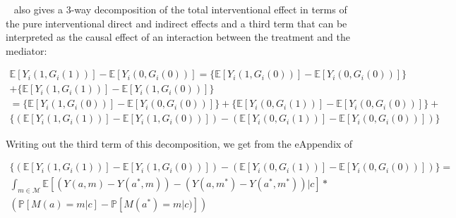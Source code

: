 ~\cite{vanderweele2014} also gives a 3-way decomposition of the total interventional effect in terms of the 
pure interventional direct and indirect effects and a third term that can be interpreted as the causal effect
of an interaction between the treatment and the mediator:

\begin{equation}
\begin{aligned}
	\mathbb{E}[Y_{i}(1,G_{i}(1))] - \mathbb{E}[Y_{i}(0,G_{i}(0))] = 
	\{\mathbb{E}[Y_{i}(1,G_{i}(0))] - \mathbb{E}[Y_{i}(0,G_{i}(0))]\}\\ 
	+ \{\mathbb{E}[Y_{i}(1,G_{i}(1))] - \mathbb{E}[Y_{i}(1,G_{i}(0))]\}\\
	= \{\mathbb{E}[Y_{i}(1,G_{i}(0))] - \mathbb{E}[Y_{i}(0,G_{i}(0))]\}
	+ \{\mathbb{E}[Y_{i}(0,G_{i}(1))] - \mathbb{E}[Y_{i}(0,G_{i}(0))]\} + \\
	\{(\mathbb{E}[Y_{i}(1,G_{i}(1))] - \mathbb{E}[Y_{i}(1,G_{i}(0))]) - 
	(\mathbb{E}[Y_{i}(0,G_{i}(1))] - \mathbb{E}[Y_{i}(0,G_{i}(0))])\}
\end{aligned}
\end{equation}

Writing out the third term of this decomposition, we get from the eAppendix of~\cite{vanderweele2014} 

\begin{equation}
\begin{aligned}
	\{(\mathbb{E}[Y_{i}(1,G_{i}(1))] - \mathbb{E}[Y_{i}(1,G_{i}(0))]) - 
	(\mathbb{E}[Y_{i}(0,G_{i}(1))] - \mathbb{E}[Y_{i}(0,G_{i}(0))])\} =\\
	\int_{m \in \mathcal{M}} \mathbb{E}[(Y(a,m) - Y(a^{*},m)) - (Y(a,m^{*}) - Y(a^{*},m^{*}))|c]*\\
	(\mathbb{P}[M(a) = m | c] - \mathbb{P}[M(a^{*}) = m | c)])
\end{aligned}
\end{equation}

